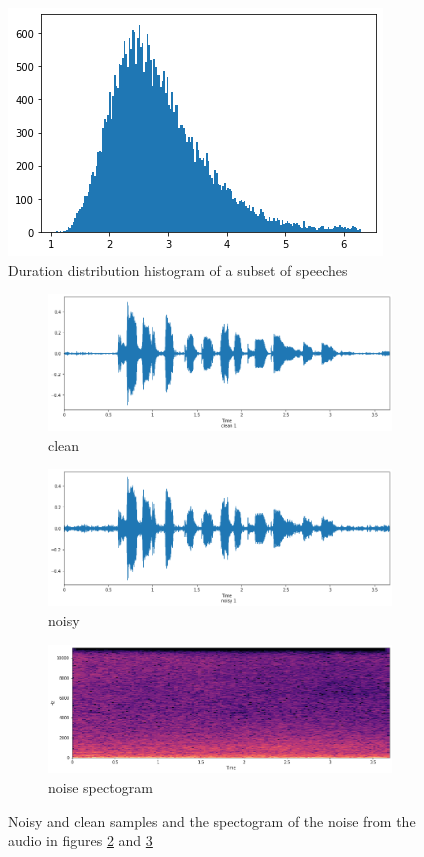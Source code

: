 \documentclass{article}
\begin{document}
	\begin{figure}[H]
		\centering
		\includegraphics[width=.5\linewidth]{durations}
		\caption{Duration distribution histogram of a subset of speeches}
		\label{fig:dur}
	\end{figure}

	\begin{figure}[H]
		\centering
		\begin{subfigure}{.5\textwidth}
			\centering
			\includegraphics[width=.8\linewidth]{wave_for_noise_clean}
			\caption{clean}
			\label{fig:wave_for_noise_clean}
		\end{subfigure}%
		\begin{subfigure}{.5\textwidth}
			\centering
			\includegraphics[width=.8\linewidth]{wave_for_noise_noisy}
			\caption{noisy}
			\label{fig:wave_for_noise_noisy}
		\end{subfigure}
		\label{fig:clean_noisy_n}
		
		\begin{subfigure}{.7\textwidth}
			\centering
			\includegraphics[width=.8\linewidth]{noise}
			\caption{noise spectogram}
			\label{fig:noise}
		\end{subfigure}
		\caption{Noisy and clean samples and the spectogram of the noise from the audio in figures \ref{fig:wave_for_noise_clean} and \ref{fig:wave_for_noise_noisy}}
		\label{fig:clean_noisy_noise}
	\end{figure}
\end{document}

